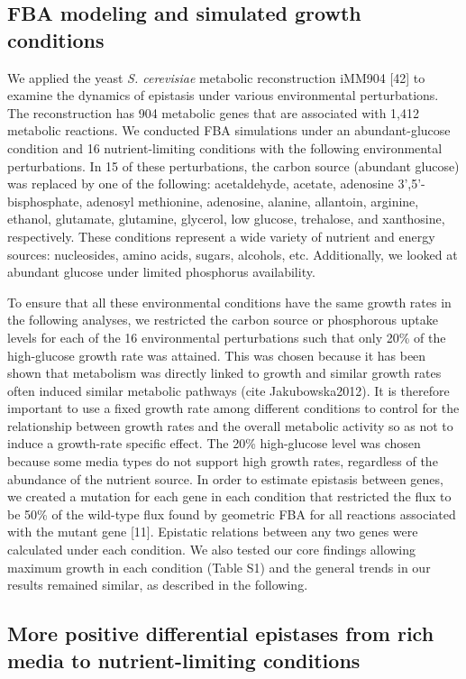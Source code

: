 \subsection{FBA modeling and simulated growth conditions}

We applied the yeast \textit{S. cerevisiae} metabolic reconstruction
iMM904 [42] to examine the dynamics of epistasis under various
environmental perturbations. The reconstruction has 904 metabolic
genes that are associated with 1,412 metabolic reactions. We conducted
FBA simulations under an abundant-glucose condition and 16
nutrient-limiting conditions with the following environmental
perturbations. In 15 of these perturbations, the carbon source
(abundant glucose) was replaced by one of the following: acetaldehyde,
acetate, adenosine 3',5'-bisphosphate, adenosyl methionine, adenosine,
alanine, allantoin, arginine, ethanol, glutamate, glutamine, glycerol,
low glucose, trehalose, and xanthosine, respectively. These conditions
represent a wide variety of nutrient and energy sources: nucleosides,
amino acids, sugars, alcohols, etc. Additionally, we looked at
abundant glucose under limited phosphorus availability.

To ensure that all these environmental conditions have the same growth
rates in the following analyses, we restricted the carbon source or
phosphorous uptake levels for each of the 16 environmental
perturbations such that only 20\% of the high-glucose growth rate was
attained. This was chosen because it has been shown that metabolism
was directly linked to growth and similar growth rates often induced
similar metabolic pathways (cite Jakubowska2012). It is therefore
important to use a fixed growth rate among different conditions to
control for the relationship between growth rates and the overall
metabolic activity so as not to induce a growth-rate specific
effect. The 20\% high-glucose level was chosen because some media
types do not support high growth rates, regardless of the abundance of
the nutrient source. In order to estimate epistasis between genes, we
created a mutation for each gene in each condition that restricted the
flux to be 50\% of the wild-type flux found by geometric FBA for all
reactions associated with the mutant gene [11]. Epistatic relations
between any two genes were calculated under each condition. We also
tested our core findings allowing maximum growth in each condition
(Table S1) and the general trends in our results remained similar, as
described in the following.

\subsection{More positive differential epistases from rich media to
nutrient-limiting conditions}

